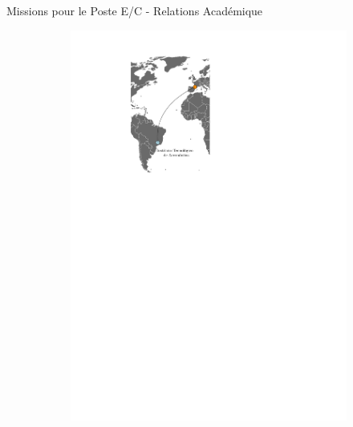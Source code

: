 \documentclass[aspectratio=169, french]{beamer}
\begin{document}
\begin{frame}{Missions pour le Poste E/C - Relations Académique}
\begin{figure}[t]
\begin{subfigure}{0.4\textwidth}
			\includegraphics[height=.65\textheight]{mappe_reseau_world.pdf} 
		\end{subfigure}
	\end{figure}
\end{frame}
\end{document}
